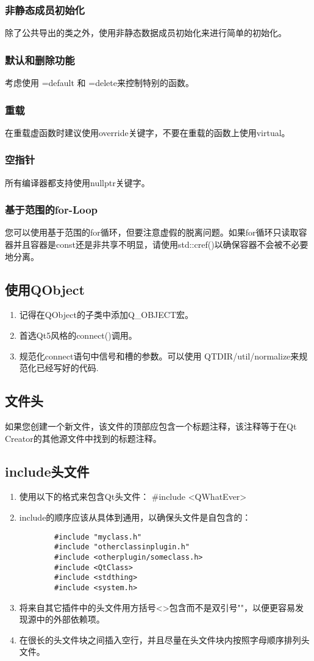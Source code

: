 \subsubsection{非静态成员初始化}
除了公共导出的类之外，使用非静态数据成员初始化来进行简单的初始化。
\subsubsection{默认和删除功能}
考虑使用 =default 和 =delete来控制特别的函数。
\subsubsection{重载}
在重载虚函数时建议使用override关键字，不要在重载的函数上使用virtual。
\subsubsection{空指针}
所有编译器都支持使用nullptr关键字。
\subsubsection{基于范围的for-Loop}
您可以使用基于范围的for循环，但要注意虚假的脱离问题。如果for循环只读取容器并且容器是const还是非共享不明显，请使用std::cref()以确保容器不会被不必要地分离。
\subsection{使用QObject}
\begin{enumerate}
	\item 记得在QObject的子类中添加Q\_OBJECT宏。
	\item 首选Qt5风格的connect()调用。
	\item 规范化connect语句中信号和槽的参数。可以使用 QTDIR/util/normalize来规范化已经写好的代码. 
\end{enumerate}
\subsection{文件头}
如果您创建一个新文件，该文件的顶部应包含一个标题注释，该注释等于在Qt Creator的其他源文件中找到的标题注释。
\subsection{include头文件}
\begin{enumerate}
	\item 使用以下的格式来包含Qt头文件：
	\#include <QWhatEver>
	\item include的顺序应该从具体到通用，以确保头文件是自包含的：
	\begin{lstlisting}
		#include "myclass.h"
		#include "otherclassinplugin.h"
		#include <otherplugin/someclass.h>
		#include <QtClass>
		#include <stdthing>
		#include <system.h>
	\end{lstlisting}
	
	\item 将来自其它插件中的头文件用方括号<>包含而不是双引号""，以便更容易发现源中的外部依赖项。
	\item 在很长的头文件块之间插入空行，并且尽量在头文件块内按照字母顺序排列头文件。
\end{enumerate}
